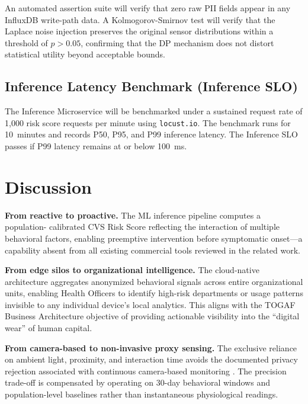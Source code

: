 \documentclass[conference]{IEEEtran}
\begin{document}
An automated assertion suite will verify that zero raw PII fields appear in any
InfluxDB write-path data. A Kolmogorov-Smirnov test will verify that the Laplace
noise injection preserves the original sensor distributions within a threshold of
$p > 0.05$, confirming that the DP mechanism does not distort statistical utility
beyond acceptable bounds.

\subsection{Inference Latency Benchmark (Inference SLO)}

The Inference Microservice will be benchmarked under a sustained request rate of
1,000 risk score requests per minute using \texttt{locust.io}. The benchmark runs
for 10~minutes and records P50, P95, and P99 inference latency. The Inference SLO
passes if P99 latency remains at or below 100~ms.

\section{Discussion}

\textbf{From reactive to proactive.} The ML inference pipeline computes a population-
calibrated CVS Risk Score reflecting the interaction of multiple behavioral factors,
enabling preemptive intervention before symptomatic onset---a capability absent from all
existing commercial tools reviewed in the related work.

\textbf{From edge silos to organizational intelligence.} The cloud-native architecture
aggregates anonymized behavioral signals across entire organizational units, enabling
Health Officers to identify high-risk departments or usage patterns invisible to any
individual device's local analytics. This aligns with the TOGAF Business Architecture
objective of providing actionable visibility into the ``digital wear'' of human capital.

\textbf{From camera-based to non-invasive proxy sensing.} The exclusive reliance on
ambient light, proximity, and interaction time avoids the documented privacy rejection
associated with continuous camera-based monitoring \cite{b4}. The precision trade-off
is compensated by operating on 30-day behavioral windows and population-level baselines
rather than instantaneous physiological readings.
\end{document}
